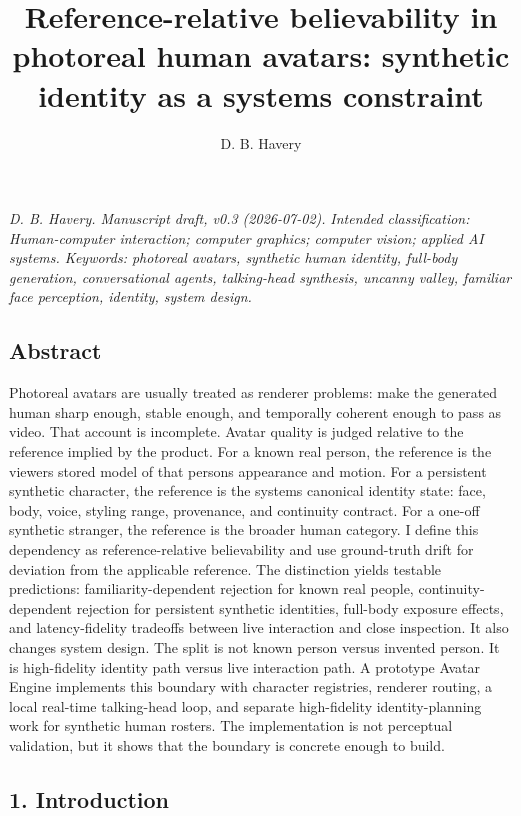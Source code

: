 \documentclass[
]{article}
\title{Reference-relative believability in photoreal human avatars:
synthetic identity as a systems constraint}
\author{D. B. Havery}
\date{}
\begin{document}
\maketitle

\emph{D. B. Havery. Manuscript draft, v0.3 (2026-07-02).} \emph{Intended
classification: Human-computer interaction; computer graphics; computer
vision; applied AI systems. Keywords: photoreal avatars, synthetic human
identity, full-body generation, conversational agents, talking-head
synthesis, uncanny valley, familiar face perception, identity, system
design.}

\subsection{Abstract}\label{abstract}

Photoreal avatars are usually treated as renderer problems: make the
generated human sharp enough, stable enough, and temporally coherent
enough to pass as video. That account is incomplete. Avatar quality is
judged relative to the reference implied by the product. For a known
real person, the reference is the viewer\textquotesingle s stored model
of that person\textquotesingle s appearance and motion. For a persistent
synthetic character, the reference is the system\textquotesingle s
canonical identity state: face, body, voice, styling range, provenance,
and continuity contract. For a one-off synthetic stranger, the reference
is the broader human category. I define this dependency as
reference-relative believability and use ground-truth drift for
deviation from the applicable reference. The distinction yields testable
predictions: familiarity-dependent rejection for known real people,
continuity-dependent rejection for persistent synthetic identities,
full-body exposure effects, and latency-fidelity tradeoffs between live
interaction and close inspection. It also changes system design. The
split is not known person versus invented person. It is high-fidelity
identity path versus live interaction path. A prototype Avatar Engine
implements this boundary with character registries, renderer routing, a
local real-time talking-head loop, and separate high-fidelity
identity-planning work for synthetic human rosters. The implementation
is not perceptual validation, but it shows that the boundary is concrete
enough to build.

\subsection{1. Introduction}\label{1-introduction}
\end{document}
